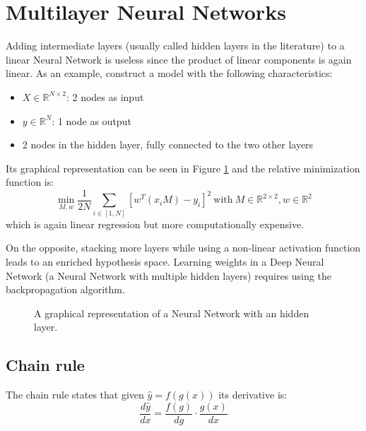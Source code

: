 \section{Multilayer Neural Networks}
Adding intermediate layers (usually called hidden layers in the literature)
to a linear Neural Network is useless
since the product of linear components is again linear.
As an example, construct a model with the following characteristics:
\begin{itemize}
    \item $X \in \mathbb{R}^{N \times 2}$: 2 nodes as input
    \item $y \in \mathbb{R}^N$: 1 node as output
    \item 2 nodes in the hidden layer, fully connected to the two other layers
\end{itemize}
Its graphical representation can be seen in Figure \ref{fig:nn-multi}
and the relative minimization function is:
\[ \displaystyle \min_{M, w} \frac{1}{2N} \sum_{i \in [1, N]} [ w^T (x_i M) - y_i ]^2
    \ \text{with} \
    M \in \mathbb{R}^{2 \times 2}, w \in \mathbb{R}^{2}\]
which is again linear regression but more computationally expensive.

On the opposite, stacking more layers while using a non-linear activation function
leads to an enriched hypothesis space. Learning weights in a Deep Neural Network
(a Neural Network with multiple hidden layers) requires using the backpropagation algorithm.

\begin{figure}[h]
    \centering
    \caption{A graphical representation of a Neural Network with an hidden layer.}
    \label{fig:nn-multi}
\end{figure}

\subsection{Chain rule}
The chain rule states that given $\hat{y} = f(g(x))$ its derivative is:
\[ \frac{d\hat{y}}{dx} = \frac{f(g)}{dg} \cdot \frac{g(x)}{dx} \]

